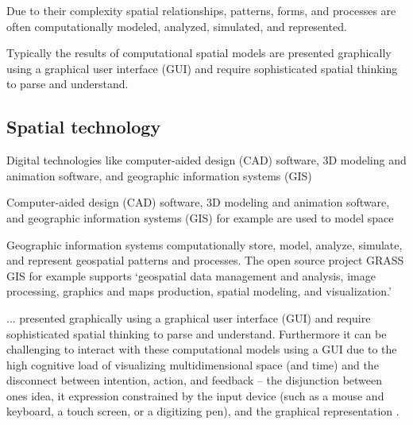 Due to their complexity spatial relationships, patterns, forms, and processes are often computationally modeled, analyzed, simulated, and represented. 

Typically the results of computational spatial models are presented graphically using a graphical user interface (GUI) and require sophisticated spatial thinking to parse and understand. 

%
\subsection{Spatial technology}

Digital technologies like computer-aided design (CAD) software, 3D modeling and animation software, and geographic information systems (GIS)

Computer-aided design (CAD) software, 3D modeling and animation software, and geographic information systems (GIS) for example are used to model space

Geographic information systems computationally store, model, analyze, simulate, and represent geospatial patterns and processes. 
%
The open source project GRASS GIS for example supports 
`geospatial data management and analysis, image processing, graphics and maps production, spatial modeling, and visualization.'


... presented graphically using a graphical user interface (GUI) and require sophisticated spatial thinking to parse and understand. 
Furthermore it can be challenging to interact with these computational models using a GUI 
due to the high cognitive load of visualizing multidimensional space (and time) %
and the disconnect between intention, action, and feedback -- 
the disjunction between ones idea, it expression constrained by the input device (such as a mouse and keyboard, a touch screen, or a digitizing pen), and the graphical representation \cite{Dourish2001,Ishii2008}. 










